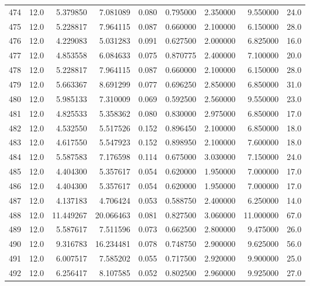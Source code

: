 \begin{tabular}{lrrrrrrrr}
474  &   12.0 &   5.379850 &   7.081089 &  0.080 &  0.795000 &  2.350000 &   9.550000 &   24.0 \\
475  &   12.0 &   5.228817 &   7.964115 &  0.087 &  0.660000 &  2.100000 &   6.150000 &   28.0 \\
476  &   12.0 &   4.229083 &   5.031283 &  0.091 &  0.627500 &  2.000000 &   6.825000 &   16.0 \\
477  &   12.0 &   4.853558 &   6.084633 &  0.075 &  0.870775 &  2.400000 &   7.100000 &   20.0 \\
478  &   12.0 &   5.228817 &   7.964115 &  0.087 &  0.660000 &  2.100000 &   6.150000 &   28.0 \\
479  &   12.0 &   5.663367 &   8.691299 &  0.077 &  0.696250 &  2.850000 &   6.850000 &   31.0 \\
480  &   12.0 &   5.985133 &   7.310009 &  0.069 &  0.592500 &  2.560000 &   9.550000 &   23.0 \\
481  &   12.0 &   4.825533 &   5.358362 &  0.080 &  0.830000 &  2.975000 &   6.850000 &   17.0 \\
482  &   12.0 &   4.532550 &   5.517526 &  0.152 &  0.896450 &  2.100000 &   6.850000 &   18.0 \\
483  &   12.0 &   4.617550 &   5.547923 &  0.152 &  0.898950 &  2.100000 &   7.600000 &   18.0 \\
484  &   12.0 &   5.587583 &   7.176598 &  0.114 &  0.675000 &  3.030000 &   7.150000 &   24.0 \\
485  &   12.0 &   4.404300 &   5.357617 &  0.054 &  0.620000 &  1.950000 &   7.000000 &   17.0 \\
486  &   12.0 &   4.404300 &   5.357617 &  0.054 &  0.620000 &  1.950000 &   7.000000 &   17.0 \\
487  &   12.0 &   4.137183 &   4.706424 &  0.053 &  0.588750 &  2.400000 &   6.250000 &   14.0 \\
488  &   12.0 &  11.449267 &  20.066463 &  0.081 &  0.827500 &  3.060000 &  11.000000 &   67.0 \\
489  &   12.0 &   5.587617 &   7.511596 &  0.073 &  0.662500 &  2.800000 &   9.475000 &   26.0 \\
490  &   12.0 &   9.316783 &  16.234481 &  0.078 &  0.748750 &  2.900000 &   9.625000 &   56.0 \\
491  &   12.0 &   6.007517 &   7.585202 &  0.055 &  0.717500 &  2.920000 &   9.900000 &   25.0 \\
492  &   12.0 &   6.256417 &   8.107585 &  0.052 &  0.802500 &  2.960000 &   9.925000 &   27.0 \\

\end{tabular}
